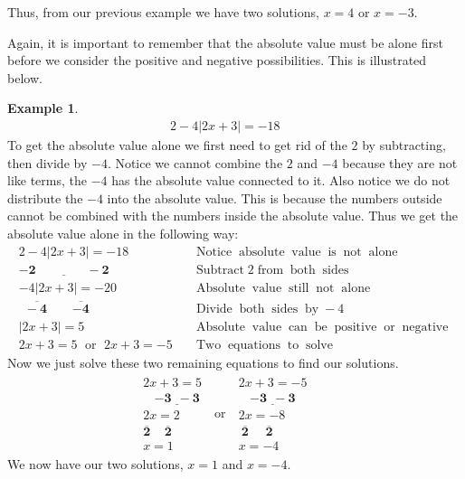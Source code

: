 \documentclass[12pt]{book}
\theoremstyle{definition}
\newtheorem{example}{Example}
\newcommand{\tmmathbf}[1]{\ensuremath{\boldsymbol{#1}}}
\newcommand{\tmop}[1]{\ensuremath{\operatorname{#1}}}
\begin{document}
Thus, from our previous example we have two solutions, $x = 4$ or $x = - 3$.\par
Again, it is important to remember that the absolute value must be alone first before we consider the positive and negative possibilities. This is illustrated below.
\begin{example}\label{Lin39}
  \begin{eqnarray*}
    2 - 4 |2x + 3| = - 18 &  & 
  \end{eqnarray*}
  To get the absolute value alone we first need to get rid of the $2$ by
  subtracting, then divide by $- 4$. Notice we cannot combine the $2$ and $-
  4$ because they are not like terms, the $- 4$ has the absolute value
  connected to it. Also notice we do not distribute the $- 4$ into the
  absolute value. This is because the numbers outside cannot be combined with
  the numbers inside the absolute value. Thus we get the absolute value alone
  in the following way:
  \begin{eqnarray*}
    2 - 4 |2x + 3| = - 18 &  & \tmop{Notice} \tmop{absolute} \tmop{value}
    \tmop{is} \tmop{not} \tmop{alone}\\
    \underline{\tmmathbf{- 2 ~~~~~~~~~~~~~~~~~~- 2}} &  & \tmop{Subtract} 2 \tmop{from}
    \tmop{both} \tmop{sides}\\
    - 4 |2x + 3| = - 20 &  & \tmop{Absolute} \tmop{value} \tmop{still}
    \tmop{not} \tmop{alone}\\
    \tmmathbf{\overline{~~- 4~~~} ~~~~~~ \overline{- 4}} &  & \tmop{Divide} \tmop{both}
    \tmop{sides} \tmop{by} - 4\\
    |2x + 3| = 5 &  & \tmop{Absolute} \tmop{value} \tmop{can} \tmop{be}
    \tmop{positive} \tmop{or} \tmop{negative}\\
    2 x + 3 = 5 \tmop{~or~} 2 x + 3 = - 5 &  & \tmop{Two} \tmop{equations}
    \tmop{to} \tmop{solve}
  \end{eqnarray*}
   Now we just solve these two remaining equations to find our solutions.
  \begin{eqnarray*}
    \begin{array}{l}
      2 x + 3 = 5\\
      ~~~~\tmmathbf{\underline{- 3 ~~- 3}}\\
      2 x = 2\\
      \tmmathbf{ \overline{2} ~~~~~ \overline{2}}\\
      x = 1
    \end{array} \tmop{~or~} \begin{array}{l}
      2 x + 3 = - 5\\
      ~~~~\tmmathbf{\underline{- 3 ~~- 3}}\\
      2 x = - 8\\
      ~\tmmathbf{ \overline{2} ~~~~~~ \overline{2}}\\
      x = - 4
    \end{array} &  & 
  \end{eqnarray*}
  We now have our two solutions, $x = 1$ and $x = - 4$.
	\end{example}
\end{document}

